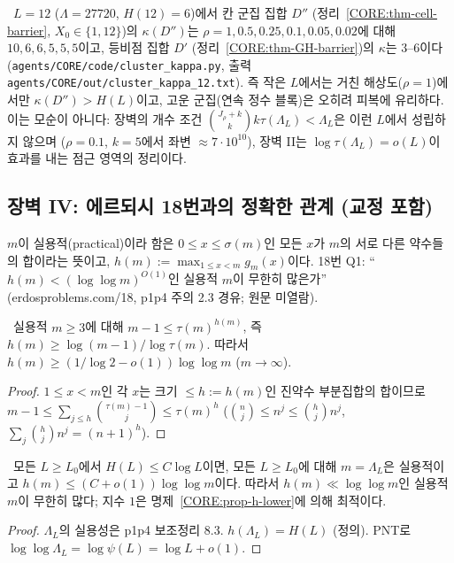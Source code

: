\begin{remark}\label{CORE:rem-cluster-num}
\NUMERIC\ $L=12$ ($\Lambda=27720$, $H(12)=6$)에서 칸 군집 집합 $D''$ (정리~\ref{CORE:thm-cell-barrier}, $X_0\in\{1,12\}$)의 $\kappa(D'')$는 $\rho=1,0.5,0.25,0.1,0.05,0.02$에 대해 $10,6,6,5,5,5$이고, 등비점 집합 $D'$ (정리~\ref{CORE:thm-GH-barrier})의 $\kappa$는 $3$–$6$이다 (\texttt{agents/CORE/code/cluster\_kappa.py}, 출력 \texttt{agents/CORE/out/cluster\_kappa\_12.txt}). 즉 작은 $L$에서는 거친 해상도($\rho=1$)에서만 $\kappa(D'')>H(L)$이고, 고운 군집(연속 정수 블록)은 오히려 피복에 유리하다. 이는 모순이 아니다: 장벽의 개수 조건 $\binom{J_\rho+k}{k}k\tau(\Lambda_L)<\Lambda_L$은 이런 $L$에서 성립하지 않으며 ($\rho=0.1$, $k=5$에서 좌변 $\approx7\cdot10^{10}$), 장벽 II는 $\log\tau(\Lambda_L)=o(L)$이 효과를 내는 점근 영역의 정리이다.
\end{remark}

\subsection{장벽 IV: 에르되시 18번과의 정확한 관계 (교정 포함)}
\label{CORE:ssec-18}

$m$이 실용적(practical)이라 함은 $0\le x\le\sigma(m)$인 모든 $x$가 $m$의 서로 다른 약수들의 합이라는 뜻이고, $h(m):=\max_{1\le x<m}g_m(x)$이다. 18번 Q1: ``$h(m)<(\log\log m)^{O(1)}$인 실용적 $m$이 무한히 많은가'' (erdosproblems.com/18, p1p4 주의 2.3 경유; 원문 미열람).

\begin{proposition}[엔트로피 하한]\label{CORE:prop-h-lower}
\PROVED\ 실용적 $m\ge3$에 대해 $m-1\le\tau(m)^{h(m)}$, 즉 $h(m)\ge\log(m-1)/\log\tau(m)$.
 따라서 $h(m)\ge(1/\log2-o(1))\log\log m$ ($m\to\infty$).
\end{proposition}
\begin{proof}
$1\le x<m$인 각 $x$는 크기 $\le h:=h(m)$인 진약수 부분집합의 합이므로 $m-1\le\sum_{j\le h}\binom{\tau(m)-1}{j}\le\tau(m)^h$ ($\binom{n}{j}\le n^j\le\binom hj n^j$, $\sum_j\binom hjn^j=(n+1)^h$).
\end{proof}

\begin{proposition}[SP1 $\Rightarrow$ 18번 Q1의 강한 형태]\label{CORE:prop-SP1-18}
\PROVED\ 모든 $L\ge L_0$에서 $H(L)\le C\log L$이면, 모든 $L\ge L_0$에 대해 $m=\Lambda_L$은 실용적이고 $h(m)\le(C+o(1))\log\log m$이다. 따라서 $h(m)\ll\log\log m$인 실용적 $m$이 무한히 많다; 지수 $1$은 명제~\ref{CORE:prop-h-lower}에 의해 최적이다.
\end{proposition}
\begin{proof}
$\Lambda_L$의 실용성은 p1p4 보조정리 8.3. $h(\Lambda_L)=H(L)$ (정의). PNT로 $\log\log\Lambda_L=\log\psi(L)=\log L+o(1)$.
\end{proof}

